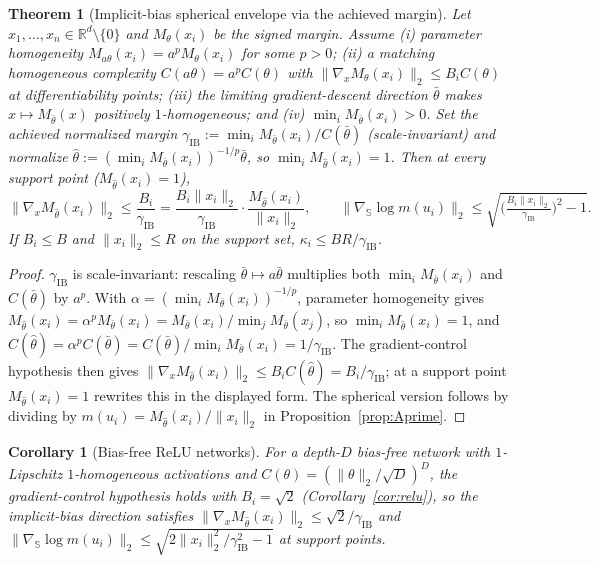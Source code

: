\documentclass[11pt]{article}
\newtheorem{theorem}{Theorem}
\newtheorem{corollary}{Corollary}
\theoremstyle{definition}
\newcommand{\R}{\mathbb{R}}
\newcommand{\Sph}{\mathbb{S}}
\newcommand{\dd}{d}
\newcommand{\grad}{\nabla}
\begin{document}
\begin{theorem}[Implicit-bias spherical envelope via the achieved margin]\label{thm:ib}
Let $x_1,\dots,x_n\in\R^{\dd}\setminus\{0\}$ and $M_\theta(x_i)$ be the signed margin.
Assume \textup{(i)} parameter homogeneity $M_{a\theta}(x_i)=a^pM_\theta(x_i)$ for some
$p>0$; \textup{(ii)} a matching homogeneous complexity $C(a\theta)=a^pC(\theta)$ with
$\|\grad_x M_\theta(x_i)\|_2\le B_iC(\theta)$ at differentiability points;
\textup{(iii)} the limiting gradient-descent direction $\bar\theta$ makes
$x\mapsto M_{\bar\theta}(x)$ positively $1$-homogeneous; and \textup{(iv)}
$\min_i M_{\bar\theta}(x_i)>0$. Set the achieved normalized margin
$\gamma_{\mathrm{IB}}:=\min_iM_{\bar\theta}(x_i)/C(\bar\theta)$ (scale-invariant) and
normalize $\widehat\theta:=(\min_iM_{\bar\theta}(x_i))^{-1/p}\bar\theta$, so
$\min_iM_{\widehat\theta}(x_i)=1$. Then at every support point ($M_{\widehat\theta}(x_i)=1$),
\[
\|\grad_x M_{\widehat\theta}(x_i)\|_2\le\frac{B_i}{\gamma_{\mathrm{IB}}}
=\frac{B_i\|x_i\|_2}{\gamma_{\mathrm{IB}}}\cdot\frac{M_{\widehat\theta}(x_i)}{\|x_i\|_2},
\qquad
\|\grad_{\Sph}\log m(u_i)\|_2\le\sqrt{\Big(\tfrac{B_i\|x_i\|_2}{\gamma_{\mathrm{IB}}}\Big)^2-1}.
\]
If $B_i\le B$ and $\|x_i\|_2\le R$ on the support set, $\kappa_i\le BR/\gamma_{\mathrm{IB}}$.
\end{theorem}
\begin{proof}
$\gamma_{\mathrm{IB}}$ is scale-invariant: rescaling $\bar\theta\mapsto a\bar\theta$
multiplies both $\min_iM_{\bar\theta}(x_i)$ and $C(\bar\theta)$ by $a^p$. With
$\alpha=(\min_iM_{\bar\theta}(x_i))^{-1/p}$, parameter homogeneity gives
$M_{\widehat\theta}(x_i)=\alpha^pM_{\bar\theta}(x_i)=M_{\bar\theta}(x_i)/\min_jM_{\bar\theta}(x_j)$,
so $\min_iM_{\widehat\theta}(x_i)=1$, and $C(\widehat\theta)=\alpha^pC(\bar\theta)
=C(\bar\theta)/\min_iM_{\bar\theta}(x_i)=1/\gamma_{\mathrm{IB}}$. The gradient-control
hypothesis then gives $\|\grad_x M_{\widehat\theta}(x_i)\|_2\le B_iC(\widehat\theta)=B_i/\gamma_{\mathrm{IB}}$;
at a support point $M_{\widehat\theta}(x_i)=1$ rewrites this in the displayed form. The
spherical version follows by dividing by $m(u_i)=M_{\widehat\theta}(x_i)/\|x_i\|_2$ in
Proposition~\ref{prop:Aprime}.
\end{proof}
\begin{corollary}[Bias-free ReLU networks]\label{cor:ib-relu}
For a depth-$D$ bias-free network with $1$-Lipschitz $1$-homogeneous activations and
$C(\theta)=(\|\theta\|_2/\sqrt D)^D$, the gradient-control hypothesis holds with
$B_i=\sqrt2$ (Corollary~\ref{cor:relu}), so the implicit-bias direction satisfies
$\|\grad_x M_{\widehat\theta}(x_i)\|_2\le\sqrt2/\gamma_{\mathrm{IB}}$ and
$\|\grad_{\Sph}\log m(u_i)\|_2\le\sqrt{2\|x_i\|_2^2/\gamma_{\mathrm{IB}}^2-1}$ at support points.
\end{corollary}
\end{document}

